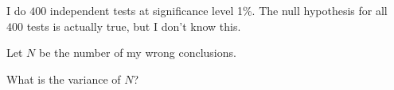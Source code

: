 
\begin{question}
I do \(400\) independent tests at significance level 1\%.
The null hypothesis for all \(400\)
tests is actually true, but I don't know this.

Let \(N\) be the number of my wrong conclusions.

What is the variance of \(N\)?
\end{question}


